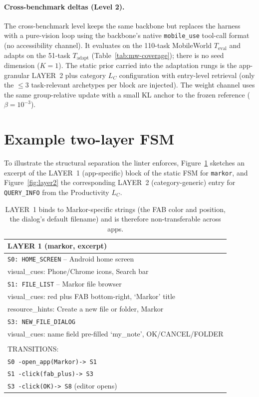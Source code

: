 \paragraph{Cross-benchmark deltas (Level 2).} The cross-benchmark level keeps the
same backbone but replaces the harness with a pure-vision loop using the
backbone's native \texttt{mobile\_use} tool-call format (no accessibility
channel). It evaluates on the 110-task MobileWorld $T_{\text{eval}}$ and adapts on
the 51-task $T_{\text{adapt}}$ (Table~\ref{tab:mw-coverage}); there is no seed
dimension ($K{=}1$). The static prior carried into the adaptation rungs is the
app-granular LAYER~2 plus category $L_C$ configuration with entry-level retrieval
(only the $\le 3$ task-relevant archetypes per block are injected). The weight
channel uses the same group-relative update with a small KL anchor to the frozen
reference ($\beta{=}10^{-3}$).

\section{Example two-layer FSM}
\label{app:fsm-example}

To illustrate the structural separation the linter enforces,
Figure~\ref{fig:layer1} sketches an excerpt of the LAYER~1 (app-specific) block
of the static FSM for \texttt{markor}, and Figure~\ref{fig:layer2} the
corresponding LAYER~2 (category-generic) entry for \texttt{QUERY\_INFO} from the
Productivity $L_C$.

\begin{table}[t]
\small
\begin{tabular}{p{}}
\hline
\textbf{LAYER 1 (markor, excerpt)} \\
\hline
\texttt{S0: HOME\_SCREEN} -- Android home screen \\
\hspace{1em} visual\_cues: Phone/Chrome icons, Search bar \\
\texttt{S1: FILE\_LIST} -- Markor file browser \\
\hspace{1em} visual\_cues: red plus FAB bottom-right, `Markor' title \\
\hspace{1em} resource\_hints: Create a new file or folder, Markor \\
\texttt{S3: NEW\_FILE\_DIALOG} \\
\hspace{1em} visual\_cues: name field pre-filled `my\_note', OK/CANCEL/FOLDER \\
\\
TRANSITIONS: \\
\texttt{S0 -open\_app(Markor)-> S1} \\
\texttt{S1 -click(fab\_plus)-> S3} \\
\texttt{S3 -click(OK)-> S8} (editor opens) \\
\hline
\end{tabular}
\caption{LAYER~1 binds to Markor-specific strings (the FAB color and position,
the dialog's default filename) and is therefore non-transferable across apps.}
\label{fig:layer1}
\end{table}

